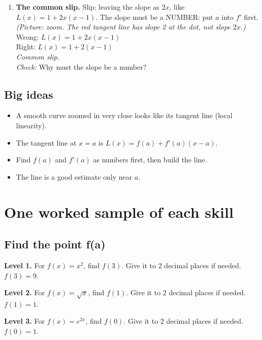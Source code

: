 \documentclass[11pt]{article}
\begin{document}
\begin{enumerate}
\item \textbf{The common slip.} Slip: leaving the slope as $2x$, like $L(x)=1+2x(x-1)$. The slope must be a NUMBER: put $a$ into $f'$ first. \textit{(Picture: zoom. The red tangent line has slope 2 at the dot, not slope $2x$.)}\\ Wrong: $L(x)=1+2x(x-1)$\\ Right: $L(x)=1+2(x-1)$\\ \textit{Common slip.}\\ \textit{Check:} Why must the slope be a number? 
\end{enumerate}
\subsection*{Big ideas}\begin{itemize}\item A smooth curve zoomed in very close looks like its tangent line (local linearity).
\item The tangent line at $x=a$ is $L(x)=f(a)+f'(a)(x-a)$.
\item Find $f(a)$ and $f'(a)$ as numbers first, then build the line.
\item The line is a good estimate only near $a$.\end{itemize}
\section*{One worked sample of each skill}
\subsection*{Find the point f(a)}
\noindent\textbf{Level 1.} For $f(x)=x^2$, find $f(3)$. Give it to 2 decimal places if needed.\\  \quad $f(3)=9$.\par\medskip
\noindent\textbf{Level 2.} For $f(x)=\sqrt{x}$, find $f(1)$. Give it to 2 decimal places if needed.\\  \quad $f(1)=1$.\par\medskip
\noindent\textbf{Level 3.} For $f(x)=e^{2x}$, find $f(0)$. Give it to 2 decimal places if needed.\\  \quad $f(0)=1$.\par\medskip
\end{document}
